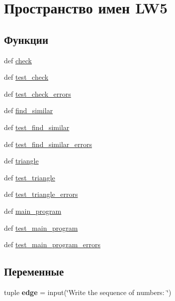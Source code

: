 \hypertarget{namespace_l_w5}{
\section{Пространство имен LW5}
\label{namespace_l_w5}
}
\subsection*{Функции}
\begin{CompactItemize}
\item 
def \hyperlink{namespace_l_w5_88a5f4487738d82cba5b3ac7c6a09282}{check}
\item 
def \hyperlink{namespace_l_w5_bd76fa8b0757a185015a19bfb4187ab2}{test\_\-check}
\item 
def \hyperlink{namespace_l_w5_b27c8f4656c69744a648a5e863d447bc}{test\_\-check\_\-errors}
\item 
def \hyperlink{namespace_l_w5_67083ef6b26830cf508d5705c82f44f7}{find\_\-similar}
\item 
def \hyperlink{namespace_l_w5_cc429e4a26de905f6b164b725d97fb1f}{test\_\-find\_\-similar}
\item 
def \hyperlink{namespace_l_w5_db1e3344370efc18d46bd9ca47552456}{test\_\-find\_\-similar\_\-errors}
\item 
def \hyperlink{namespace_l_w5_487d20d1da82494dd97dda4048ca32cd}{triangle}
\item 
def \hyperlink{namespace_l_w5_a8dfc65142348966740631e021a65b50}{test\_\-triangle}
\item 
def \hyperlink{namespace_l_w5_f8cbf0a3bea8e2d9026208357fea8a3c}{test\_\-triangle\_\-errors}
\item 
def \hyperlink{namespace_l_w5_f4d62490e315452ac8f09431ecebc77d}{main\_\-program}
\item 
def \hyperlink{namespace_l_w5_36f7970fbe6df884e3cde515e595d471}{test\_\-main\_\-program}
\item 
def \hyperlink{namespace_l_w5_24b0846f3346125f53f802a4f6291546}{test\_\-main\_\-program\_\-errors}
\end{CompactItemize}
\subsection*{Переменные}
\begin{CompactItemize}
\item 
\hypertarget{namespace_l_w5_9fd474556c4744ef6d4f72f597ef9e0f}{
tuple \textbf{edge} = input(\char`\"{}Write the sequence of numbers: \char`\"{})}
\label{namespace_l_w5_9fd474556c4744ef6d4f72f597ef9e0f}

\end{CompactItemize}


